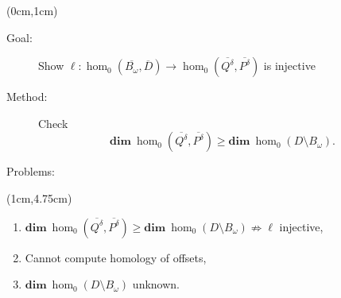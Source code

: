 \begin{frame}
  \begin{textblock*}{12cm}(0cm,1cm)
    \begin{small}
    \begin{description}
      \item[Goal:] Show $\ell : \hom_0(\overline{B_\omega}, \overline{D})\to \hom_0(\overline{Q^\delta},\overline{P^\delta})$ is injective
      \item[Method:] Check \[\mathbf{dim}~\hom_0(\overline{Q^\delta},\overline{P^\delta})\geq \mathbf{dim}~\hom_0(D\setminus B_\omega).\]
      \item[Problems:]
    \end{description}
    \end{small}
  \end{textblock*}

  \begin{textblock*}{11cm}(1cm,4.75cm)
    \begin{small}
    \begin{enumerate}[a]
      \item $\mathbf{dim}~\hom_0(\overline{Q^\delta}, \overline{P^\delta})\geq \mathbf{dim}~\hom_0(D\setminus B_\omega)\nRightarrow \ell$ injective,
      \item Cannot compute homology of offsets,
      \item $\mathbf{dim}~\hom_0(D\setminus B_\omega)$ unknown.
    \end{enumerate}
    \end{small}
  \end{textblock*}
\end{frame}

